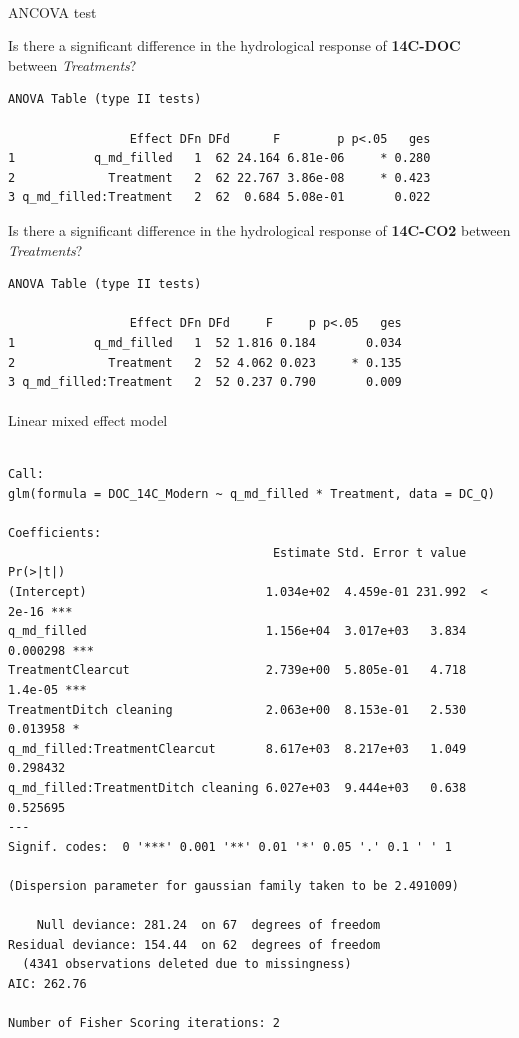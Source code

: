 \documentclass[
]{article}
\makeatletter
\let\oldparagraph\paragraph
\renewcommand{\paragraph}{
    \@ifstar
      \xxxParagraphStar
      \xxxParagraphNoStar
  }
\newcommand{\xxxParagraphStar}[1]{\oldparagraph*{#1}\mbox{}}
\newcommand{\xxxParagraphNoStar}[1]{\oldparagraph{#1}\mbox{}}
\makeatother
\begin{document}
\paragraph{ANCOVA test}\label{ancova-test-1}

Is there a significant difference in the hydrological response of
\textbf{14C-DOC} between \emph{Treatments}?

\begin{verbatim}
ANOVA Table (type II tests)

                 Effect DFn DFd      F        p p<.05   ges
1           q_md_filled   1  62 24.164 6.81e-06     * 0.280
2             Treatment   2  62 22.767 3.86e-08     * 0.423
3 q_md_filled:Treatment   2  62  0.684 5.08e-01       0.022
\end{verbatim}

Is there a significant difference in the hydrological response of
\textbf{14C-CO2} between \emph{Treatments}?

\begin{verbatim}
ANOVA Table (type II tests)

                 Effect DFn DFd     F     p p<.05   ges
1           q_md_filled   1  52 1.816 0.184       0.034
2             Treatment   2  52 4.062 0.023     * 0.135
3 q_md_filled:Treatment   2  52 0.237 0.790       0.009
\end{verbatim}

\paragraph{Linear mixed effect model}\label{linear-mixed-effect-model}

\begin{verbatim}

Call:
glm(formula = DOC_14C_Modern ~ q_md_filled * Treatment, data = DC_Q)

Coefficients:
                                     Estimate Std. Error t value Pr(>|t|)    
(Intercept)                         1.034e+02  4.459e-01 231.992  < 2e-16 ***
q_md_filled                         1.156e+04  3.017e+03   3.834 0.000298 ***
TreatmentClearcut                   2.739e+00  5.805e-01   4.718  1.4e-05 ***
TreatmentDitch cleaning             2.063e+00  8.153e-01   2.530 0.013958 *  
q_md_filled:TreatmentClearcut       8.617e+03  8.217e+03   1.049 0.298432    
q_md_filled:TreatmentDitch cleaning 6.027e+03  9.444e+03   0.638 0.525695    
---
Signif. codes:  0 '***' 0.001 '**' 0.01 '*' 0.05 '.' 0.1 ' ' 1

(Dispersion parameter for gaussian family taken to be 2.491009)

    Null deviance: 281.24  on 67  degrees of freedom
Residual deviance: 154.44  on 62  degrees of freedom
  (4341 observations deleted due to missingness)
AIC: 262.76

Number of Fisher Scoring iterations: 2
\end{verbatim}
\end{document}
